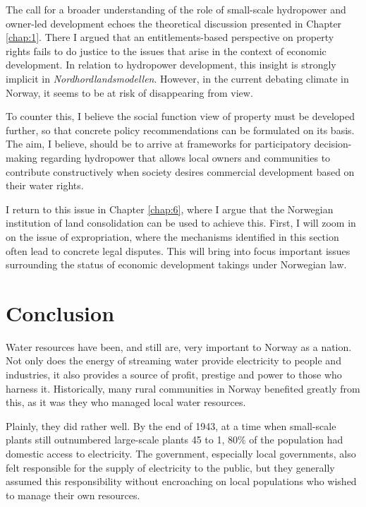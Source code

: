 The call for a broader understanding of the role of small-scale hydropower and owner-led development echoes the theoretical discussion presented in Chapter \ref{chap:1}. There I argued that an entitlements-based perspective on property rights fails to do justice to the issues that arise in the context of economic development. In relation to hydropower development, this insight is strongly implicit in {\it Nordhordlandsmodellen}. However, in the current debating climate in Norway, it seems to be at risk of disappearing from view.

To counter this, I believe the social function view of property must be developed further, so that concrete policy recommendations can be formulated on its basis. The aim, I believe, should be to arrive at frameworks for participatory decision-making regarding hydropower that allows local owners and communities to contribute constructively when society desires commercial development based on  their water rights.

I return to this issue in Chapter \ref{chap:6}, where I argue that the Norwegian institution of land consolidation can be used to achieve this. First, I will zoom in on the issue of expropriation, where the mechanisms identified in this section often lead to concrete legal disputes. This will bring into focus important issues surrounding the status of economic development takings under Norwegian law.

\section{Conclusion}\label{sec:conc3}

Water resources have been, and still are, very important to Norway as a nation. Not only does the energy of streaming water provide electricity to people and industries, it also provides a source of profit, prestige and power to those who harness it. Historically, many rural communities in Norway benefited greatly from this, as it was they who managed local water resources.

Plainly, they did rather well. By the end of 1943, at a time when small-scale plants still outnumbered large-scale plants 45 to 1, $80 \%$ of the population had domestic access to electricity. The government, especially local governments, also felt responsible for the supply of electricity to the public, but they generally assumed this responsibility without encroaching on local populations who wished to manage their own resources.

